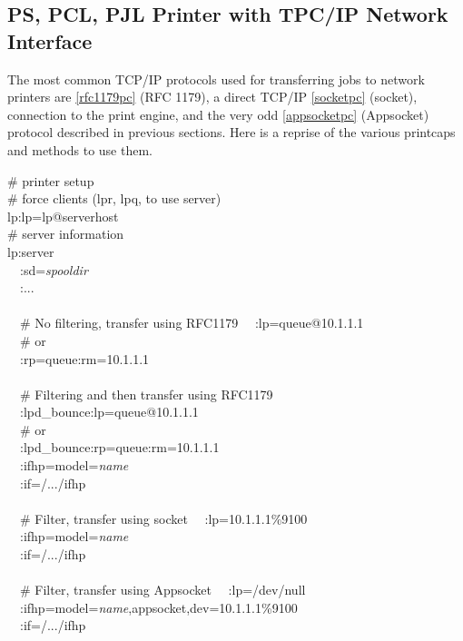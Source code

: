 \documentclass[a4paper]{article}
\begin{document}
\subsection{PS, PCL, PJL Printer with TPC/IP Network Interface}

The most common TCP/IP protocols used for transferring
jobs to network printers are
\ref{rfc1179pc} {(RFC 1179)},
a direct TCP/IP
\ref{socketpc} {(socket)},
connection to the print engine,
and the very odd 
\ref{appsocketpc} {(Appsocket)} protocol described
in previous sections.
Here is a reprise of the various printcaps and methods
to use them.
\begin{tscreen}
\# printer setup  \\ 
\#  force clients (lpr, lpq, to use server)  \\ 
lp:lp=lp@serverhost  \\ 
\# server information  \\ 
lp:server  \\ 
~~:sd={\itshape spooldir\/}  \\ 
~~:...  \\ \\ 
~~\# No filtering, transfer using RFC1179
~~:lp=queue@10.1.1.1\\ 
~~\#    or \\ 
~~:rp=queue:rm=10.1.1.1\\ \\ 
~~\# Filtering and then transfer using RFC1179
~~:lpd\_bounce:lp=queue@10.1.1.1\\ 
~~\#    or \\ 
~~:lpd\_bounce:rp=queue:rm=10.1.1.1\\ 
~~:ifhp=model={\itshape name\/}\\ 
~~:if=/.../ifhp  \\ \\ 
~~\# Filter, transfer using socket
~~:lp=10.1.1.1\%9100 \\ 
~~:ifhp=model={\itshape name\/}\\ 
~~:if=/.../ifhp  \\ \\ 
~~\# Filter, transfer using Appsocket
~~:lp=/dev/null \\ 
~~:ifhp=model={\itshape name\/},appsocket,dev=10.1.1.1\%9100 \\ 
~~:if=/.../ifhp  \\ 
\end{tscreen}
\end{document}
